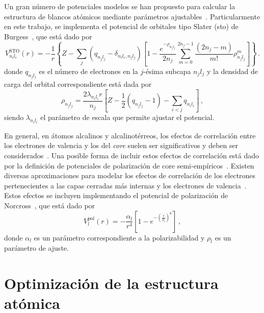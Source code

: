Un gran número de potenciales modelos se han propuesto para calcular la 
estructura de blancos atómicos mediante parámetros 
ajustables~\cite{Hibbert:82,Gombas:56,Green:69,Klapisch:71,Phillips:59,
Herman:63,Dalgarno:70,Bayliss:77,Cowan:76,Lee:77}. 
Particularmente en este trabajo, se implementa el potencial de orbitales 
tipo Slater (\acs{sto}) de Burgess~\cite{Burgess:89}, que está dado por
\begin{equation}
V_{n_il_i}^{\textrm{STO}}(r)=-\frac{1}{r}\left\{Z-\sum_j(q_{n_jl_j}-
\delta_{n_il_i,n_jl_j})
\left[1-\frac{e^{-\rho_{n_jl_j}}}{2n_j}\sum_{m=0}^{2n_j-1}
\frac{(2n_j-m)}{m!}\rho_{n_jl_j}^m\right]\right\}\,.
\label{eq:STO-pot}
\end{equation}
donde $q_{n_jl_j}$ es el número de electrones en la $j$-ésima subcapa 
$n_jl_j$ y la densidad de carga del orbital correspondiente está dada 
por
\begin{equation}
\rho_{n_jl_j}= \frac{2\lambda_{n_il_i}r}{n_j}\left[Z-
\frac{1}{2}\left(q_{n_jl_j}-1\right)-\sum_{i<j} q_{n_il_i}\right]\,,
\end{equation}
siendo $\lambda_{n_il_i}$ el parámetro de escala que permite ajustar el 
potencial. 

En general, en átomos alcalinos y alcalinotérreos, los efectos de 
correlación entre los electrones de valencia y los del \textit{core} 
suelen ser significativos y deben ser considerados~\cite{Bartschat:04,
Muller:83}. Una posible forma de incluir estos efectos de correlación 
está dado por la definición de potenciales de polarización de core 
semi-empíricos~\cite{Loughlin:88}. Existen diversas aproximaciones para 
modelar los efectos de correlación de los electrones pertenecientes a 
las capas cerradas más internas y los electrones de 
valencia~\cite{Seaton:72,Loughlin:73,Migdalek:78}. Estos efectos se 
incluyen implementando el potencial de polarización de 
Norcross~\cite{Norcross:76}, que está dado por
\begin{equation}
 V_l^{\textrm{pol}}(r) = -\frac{\alpha_l}{r^4}\left[1-
e^{-\left(\tfrac{r}{\rho_l}\right)^6}\right]\,,
\label{eq:Norcross-pot}
\end{equation}
donde $\alpha_l$ es un parámetro correspondiente a la polarizabilidad y 
$\rho_l$ es un parámetro de ajuste.

\section{Optimización de la estructura atómica}
\label{sec:optproblems}

